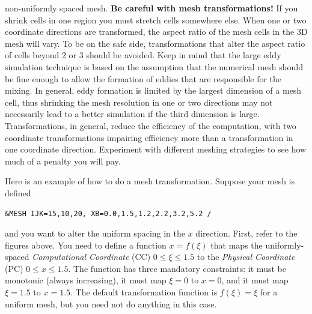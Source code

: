 \documentclass[11pt]{book}
\begin{document}
non-uniformly spaced mesh. {\bf Be careful with mesh transformations!}  If you shrink cells in one
region you must stretch cells somewhere else. When one
or two coordinate directions are transformed, the aspect ratio of the
mesh cells in the 3D mesh will vary. To be on the safe side, transformations
that alter the aspect ratio of cells beyond 2 or 3 should be avoided.
Keep in mind that the large eddy simulation technique is based on the
assumption that the numerical mesh should be fine enough to allow the formation
of eddies that are responsible for the mixing. In general, eddy formation
is limited by the largest dimension of a mesh cell, thus shrinking the
mesh resolution in one or two directions may not necessarily lead to a better
simulation if the third dimension is large. Transformations, in general, reduce the efficiency of the computation,
with two coordinate transformations impairing efficiency more
than a transformation in one coordinate direction. Experiment with different meshing
strategies to see how much of a penalty you will pay.

Here is an example of how to do a mesh transformation. Suppose your mesh is defined
\begin{lstlisting}
&MESH IJK=15,10,20, XB=0.0,1.5,1.2,2.2,3.2,5.2 /
\end{lstlisting}
and you want to alter the uniform spacing in the $x$ direction.
First, refer to the figures above.
You need to define a function $x = f(\xi)$ that maps the uniformly-spaced
{\em Computational Coordinate} ({\ct CC}) $0 \le \xi \le 1.5$
to the {\em Physical Coordinate} ({\ct PC}) $0 \le x \le 1.5$.
The function has three mandatory constraints: it must be monotonic (always increasing),
it must map $\xi=0$ to $x=0$, and it must map $\xi=1.5$ to $x=1.5$.
The default transformation function is $f(\xi) = \xi$ for a uniform mesh, but you need not do
anything in this case.
\end{document}
